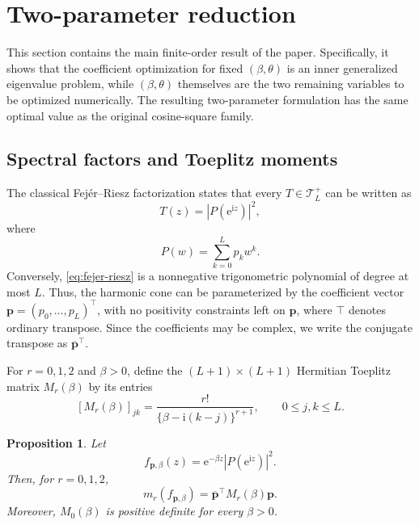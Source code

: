 \documentclass[11pt]{article}
\numberwithin{equation}{section}
\newtheorem{proposition}[theorem]{Proposition}
\theoremstyle{remark}
\newcommand{\e}{\mathrm e}
\newcommand{\ii}{\mathrm i}
\newcommand{\Tcal}{\mathcal T}
\newcommand{\abs}[1]{\left|#1\right|}
\begin{document}
\section{Two-parameter reduction}\label{sec:reduction}

This section contains the main finite-order result of the paper. Specifically, it shows that the coefficient optimization for fixed $(\beta,\theta)$ is an inner generalized eigenvalue problem, while $(\beta,\theta)$ themselves are the two remaining variables to be optimized numerically. The resulting two-parameter formulation has the same optimal value as the original cosine-square family.

\subsection{Spectral factors and Toeplitz moments}

The classical Fej\'er--Riesz factorization \citep[Section~1]{DritschelRovnyak2010} states that every $T\in\Tcal_L^+$ can be written as
\begin{equation}\label{eq:fejer-riesz}
  T(z)=\abs{P(\e^{\ii z})}^2,
\end{equation}
where 
\[
     P(w)=\sum_{k=0}^{L}p_kw^k.
\]
Conversely, \eqref{eq:fejer-riesz} is a nonnegative trigonometric polynomial of degree at most $L$. Thus, the harmonic cone can be parameterized by the coefficient vector $\bm p=(p_0,\ldots,p_L)^{\top}$, with no positivity constraints left on $\bm p$, where $\top$ denotes ordinary transpose. Since the coefficients may be complex, we write the conjugate transpose as $\overline{\bm p}^{\top}$.

For $r=0,1,2$ and $\beta>0$, define the $(L+1)\times(L+1)$ Hermitian Toeplitz matrix $M_r(\beta)$ by its entries
\begin{equation}\label{eq:moment-matrix}
  [M_r(\beta)]_{jk}
  =\frac{r!}{\{\beta-\ii(k-j)\}^{r+1}},
  \qquad 0\leq j,k\leq L.
\end{equation}

\begin{proposition}\label{prop:moment-identity}
Let
\[
  f_{\bm p,\beta}(z)
  =\e^{-\beta z}\abs{P(\e^{\ii z})}^2.
\]
Then, for $r=0,1,2$,
\begin{equation}\label{eq:moment-quadratic}
  m_r(f_{\bm p,\beta})=\overline{\bm p}^{\top}M_r(\beta)\bm p.
\end{equation}
Moreover, $M_0(\beta)$ is positive definite for every $\beta>0$.
\end{proposition}
\end{document}
